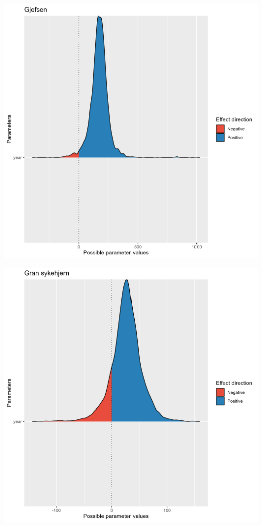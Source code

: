 \documentclass[
  letterpaper,
  DIV=11,
  numbers=noendperiod]{scrreport}
\begin{document}
\includegraphics{data/derived_data/direction_plots/plots/Gjefsen.png}

\includegraphics{data/derived_data/direction_plots/plots/Gran sykehjem.png}
\end{document}
